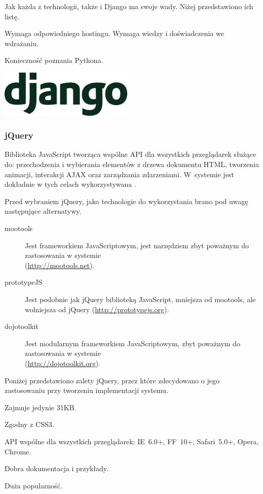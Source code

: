Jak każda z technologii, także i Django ma swoje wady. Niżej przedstawiono ich listę.
\begin{packed_item}
    \item{Wymaga odpowiedniego hostingu. Wymaga wiedzy i doświadczenia we wdrażaniu.}
    \item{Konieczność poznania Pythona.}
\end{packed_item}

\begin{center}
    \includegraphics[width=0.48\textwidth]{img/logos/django.jpg}
\end{center}

\newpage
\subsubsection{jQuery}
Biblioteka JavaScript tworząca wspólne API dla wszystkich przeglądarek służące do: przechodzenia i wybierania elementów z drzewa dokumentu HTML, tworzenia animacji, interakcji AJAX oraz zarządzania zdarzeniami. W~systemie jest dokładnie w tych celach wykorzystywana \cite{jQuery}.

Przed wybraniem jQuery, jako technologie do wykorzystania brano pod uwagę następujące alternatywy.
\begin{description}
    \item[mootools] Jest frameworkiem JavaScriptowym, jest narzędziem zbyt poważnym do zastosowania w systemie \\(\url{http://mootools.net}).
    \item[prototypeJS] Jest podobnie jak jQuery biblioteką JavaScript, mniejsza od mootools, ale wolniejsza od jQuery (\url{http://prototypejs.org}).
    \item[dojotoolkit] Jest modularnym frameworkiem JavaScriptowym, zbyt poważnym do zastosowania w systemie \\(\url{http://dojotoolkit.org}).
\end{description}

Poniżej przedstawiono zalety jQuery, przez które zdecydowano o jego zastosowaniu przy tworzeniu implementacji systemu.
\begin{packed_item}
    \item{Zajmuje jedynie 31KB.}
    \item{Zgodny z CSS3.}
    \item{API wspólne dla wszystkich przeglądarek: IE~6.0+, FF~10+, Safari~5.0+, Opera, Chrome.}
    \item{Dobra dokumentacja i przykłady.}
    \item{Duża popularność.}
\end{packed_item}

